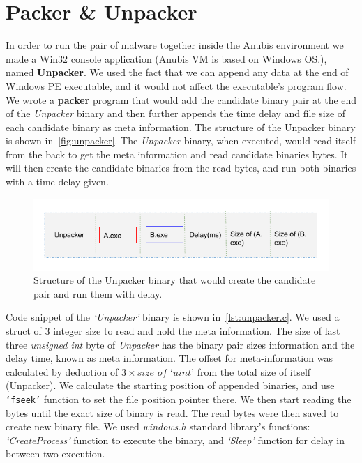 \section{Packer \& Unpacker}
\label{sec:packerunpacker}
In order to run the pair of malware together inside the Anubis environment we made a Win32 console application (Anubis VM is based on Windows OS.\@), named \textbf{Unpacker}.
We used the fact that we can append any data at the end of Windows PE executable, and it would not affect the executable's program flow.
We wrote a \textbf{packer} program that would add the candidate binary pair at the end of the \emph{Unpacker} binary and then further appends the time delay and file size of each candidate binary as meta information.
The structure of the Unpacker binary is shown in~\autoref{fig:unpacker}.
The \emph{Unpacker} binary, when executed, would read itself from the back to get the meta information and read candidate binaries bytes.
It will then create the candidate binaries from the read bytes, and run both binaries with a time delay given.\\
\begin{figure}[htbp]
  \centering
  \includegraphics[scale=0.5]{figures/unpacker.png}
\caption{Structure of the Unpacker binary that would create the candidate pair and run them with delay.}
\label{fig:unpacker}
\end{figure}

Code snippet of the \emph{`Unpacker'} binary is shown in~\autoref{lst:unpacker.c}.
We used a struct of 3 integer size to read and hold the meta information. The size of last three \textit{unsigned int} byte of \emph{Unpacker} has the binary pair sizes information and the delay time, known as meta information.
The offset for meta-information was calculated by deduction of $3 \times \textit{size of `uint'}$ from the total size of itself (Unpacker).
We calculate the starting position of appended binaries, and use \texttt{`fseek\(\)'} function to set the file position pointer there.
We then start reading the bytes until the exact size of binary is read.
The read bytes were then saved to create new binary file.
We used \emph{windows.h} standard library's functions: \emph{`CreateProcess'} function to execute the binary, and \emph{`Sleep'} function for delay in between two execution.\\

